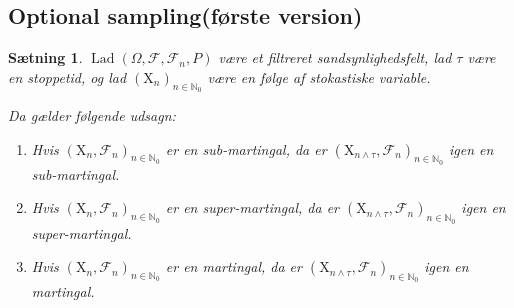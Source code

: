 \documentclass{article}
\newcommand{\1}{\mathbbm{1}}
\theoremstyle{boxed}
\newtheorem{proposition}[theorem]{Sætning}
\begin{document}
\subsection{Optional sampling(første version)}
\begin{theorem-box}
    \begin{proposition}
        $\operatorname{Lad}\left(\Omega, \mathcal{F}, \mathcal{F}_n, P\right)$ være et filtreret sandsynlighedsfelt, lad $\tau$ være en stoppetid, og lad $\left(\mathrm{X}_n\right)_{n \in \mathbb{N}_0}$ være en følge af stokastiske variable.

Da gælder følgende udsagn:
\begin{enumerate}
    \item[\textnormal{(i)}] Hvis $\left(\mathrm{X}_n, \mathcal{F}_n\right)_{n \in \mathbb{N}_0}$ er en sub-martingal, da er $\left(\mathrm{X}_{n \wedge \tau}, \mathcal{F}_n\right)_{n \in \mathbb{N}_0}$ igen en sub-martingal.
    \item[\textnormal{(ii)}]Hvis $\left(\mathrm{X}_n, \mathcal{F}_n\right)_{n \in \mathbb{N}_0}$ er en super-martingal, da er $\left(\mathrm{X}_{n \wedge \tau}, \mathcal{F}_n\right)_{n \in \mathbb{N}_0}$ igen en super-martingal.
    \item[\textnormal{(iii)}] Hvis $\left(\mathrm{X}_n, \mathcal{F}_n\right)_{n \in \mathbb{N}_0}$ er en martingal, da er $\left(\mathrm{X}_{n \wedge \tau}, \mathcal{F}_n\right)_{n \in \mathbb{N}_0}$ igen en martingal.
\end{enumerate}
    \end{proposition}
\end{theorem-box}
\end{document}
